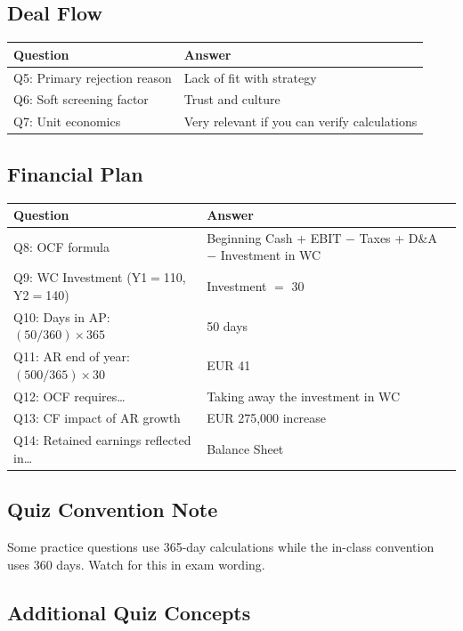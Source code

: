 \documentclass[a4paper,11pt]{article}
\begin{document}
\subsection{Deal Flow}

\begin{tabular}{@{}p{}p{}@{}}
\toprule
\textbf{Question} & \textbf{Answer} \\
\midrule
Q5: Primary rejection reason & Lack of fit with strategy \\
Q6: Soft screening factor & Trust and culture \\
Q7: Unit economics & Very relevant if you can verify calculations \\
\bottomrule
\end{tabular}

\subsection{Financial Plan}

\begin{tabular}{@{}p{}p{}@{}}
\toprule
\textbf{Question} & \textbf{Answer} \\
\midrule
Q8: OCF formula & Beginning Cash + EBIT $-$ Taxes + D\&A $-$ Investment in WC \\
Q9: WC Investment (Y1$=$110, Y2$=$140) & Investment $=$ 30 \\
Q10: Days in AP: $(50/360) \times 365$ & 50 days \\
Q11: AR end of year: $(500/365) \times 30$ & EUR 41 \\
Q12: OCF requires\ldots & Taking away the investment in WC \\
Q13: CF impact of AR growth & EUR 275,000 increase \\
Q14: Retained earnings reflected in\ldots & Balance Sheet \\
\bottomrule
\end{tabular}

\subsection{Quiz Convention Note}

Some practice questions use 365-day calculations while the in-class convention uses 360 days. Watch for this in exam wording.

\subsection{Additional Quiz Concepts}
\end{document}
